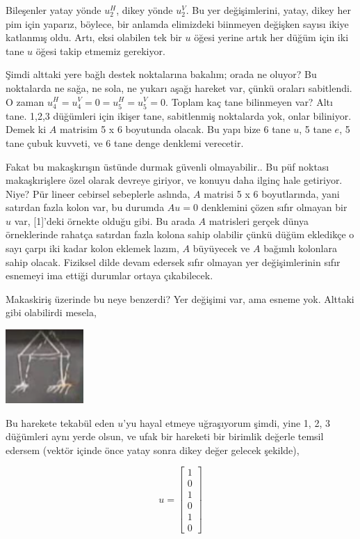 \documentclass[12pt,fleqn]{article}\usepackage{../../common}
\begin{document}
Bileşenler yatay yönde $u_2^H$, dikey yönde $u_2^V$. Bu yer değişimlerini,
yatay, dikey her pim için yaparız, böylece, bir anlamda elimizdeki biinmeyen
değişken sayısı ikiye katlanmış oldu. Artı, eksi olabilen tek bir $u$ öğesi
yerine artık her düğüm için iki tane $u$ öğesi takip etmemiz gerekiyor.

Şimdi alttaki yere bağlı destek noktalarına bakalım; orada ne oluyor?  Bu
noktalarda ne sağa, ne sola, ne yukarı aşağı hareket var, çünkü oraları
sabitlendi. O zaman $u_4^H = u_4^V = 0 = u_5^H = u_5^V = 0$.  Toplam kaç tane
bilinmeyen var? Altı tane. 1,2,3 düğümleri için ikişer tane, sabitlenmiş
noktalarda yok, onlar biliniyor. Demek ki $A$ matrisim 5 x 6 boyutunda olacak.
Bu yapı bize 6 tane $u$, 5 tane $e$, 5 tane çubuk kuvveti, ve 6 tane denge
denklemi verecetir.

Fakat bu makaşkırışın üstünde durmak güvenli olmayabilir.. Bu püf noktası
makaşkırişlere özel olarak devreye giriyor, ve konuyu daha ilginç hale
getiriyor. Niye? Pür lineer cebirsel sebeplerle aslında, $A$ matrisi 5 x 6
boyutlarında, yani satırdan fazla kolon var, bu durumda $A u = 0$ denklemini
çözen sıfır olmayan bir $u$ var, [1]'deki örnekte olduğu gibi. Bu arada $A$
matrisleri gerçek dünya örneklerinde rahatça satırdan fazla kolona sahip
olabilir çünkü düğüm ekledikçe o sayı çarpı iki kadar kolon eklemek lazım, $A$
büyüyecek ve $A$ bağımlı kolonlara sahip olacak. Fiziksel dilde devam edersek
sıfır olmayan yer değişimlerinin sıfır esnemeyi ima ettiği durumlar ortaya
çıkabilecek.

Makaskiriş üzerinde bu neye benzerdi? Yer değişimi var, ama esneme yok.  Alttaki
gibi olabilirdi mesela,

\includegraphics[width=8em]{compscieng_1_15_03.png}

Bu harekete tekabül eden $u$'yu hayal etmeye uğraşıyorum şimdi, yine 1, 2, 3
düğümleri aynı yerde olsun, ve ufak bir hareketi bir birimlik değerle temsil
edersem (vektör içinde önce yatay sonra dikey değer gelecek şekilde),

$$
u = \left[\begin{array}{r}
1 \\ 0 \\ 1 \\ 0 \\ 1 \\ 0
\end{array}\right]
$$
\end{document}
